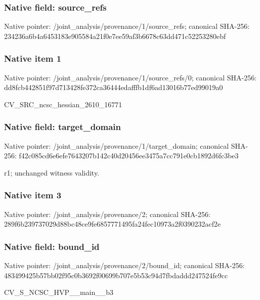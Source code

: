 \documentclass[10pt,a4paper]{article}
\begin{document}
\subsubsection{Native field: source\_\allowbreak{}refs}
Native pointer: /joint\_\allowbreak{}analysis/provenance/1/source\_\allowbreak{}refs; canonical SHA-256: 234236a6b4a6453183e905584a21f0e7ee59af3b6678c63dd471c52253280ebf

\subsubsection{Native item 1}
Native pointer: /joint\_\allowbreak{}analysis/provenance/1/source\_\allowbreak{}refs/0; canonical SHA-256: dd8fcb442851f97d713428fe372ca36444edafffb1df6ad13016b77ed99019a0

\begingroup\raggedright\sloppy CV\_\allowbreak{}SRC\_\allowbreak{}ncsc\_\allowbreak{}hessian\_\allowbreak{}2610\_\allowbreak{}16771\par\endgroup

\subsubsection{Native field: target\_\allowbreak{}domain}
Native pointer: /joint\_\allowbreak{}analysis/provenance/1/target\_\allowbreak{}domain; canonical SHA-256: f42c085cd6e6efe7643207b142c40d20456ee3475a7cc791e0cb1892d6fc3be3

\begingroup\raggedright\sloppy r1;\allowbreak{} unchanged witness validity.\par\endgroup

\subsubsection{Native item 3}
Native pointer: /joint\_\allowbreak{}analysis/provenance/2; canonical SHA-256: 289f6b239737029d88bc48ce9fe6857771495fa24fec10973a2f0390232acf2e

\subsubsection{Native field: bound\_\allowbreak{}id}
Native pointer: /joint\_\allowbreak{}analysis/provenance/2/bound\_\allowbreak{}id; canonical SHA-256: 483499425b57bb02f95c0b3692f00699b707e5b53c94d7fbdaddd247524fe9cc

\begingroup\raggedright\sloppy CV\_\allowbreak{}S\_\allowbreak{}NCSC\_\allowbreak{}HVP\_\allowbreak{}\_\allowbreak{}main\_\allowbreak{}\_\allowbreak{}b3\par\endgroup
\end{document}
